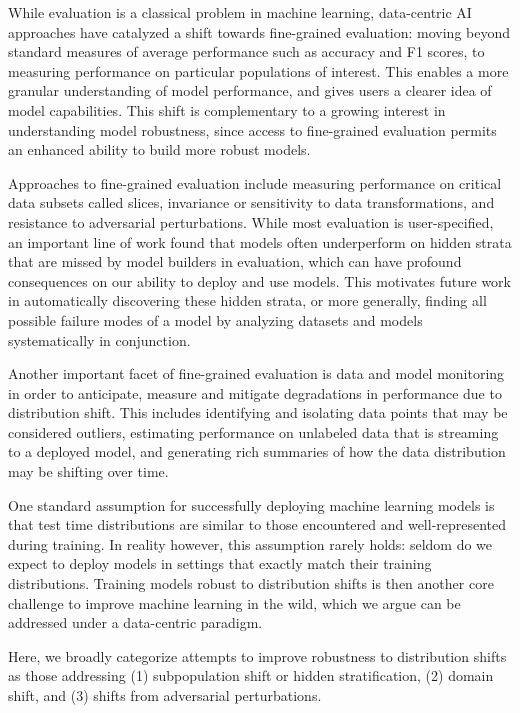 \documentclass[openany]{book}
\begin{document}
While evaluation is a classical problem in machine learning, data-centric AI approaches have catalyzed a shift towards fine-grained evaluation: moving beyond standard measures of average performance such as accuracy and F1 scores, to measuring performance on particular populations of interest. This enables a more granular understanding of model performance, and gives users a clearer idea of model capabilities. This shift is complementary to a growing interest in understanding model robustness, since access to fine-grained evaluation permits an enhanced ability to build more robust models.

Approaches to fine-grained evaluation include measuring performance on critical data subsets called slices, invariance or sensitivity to data transformations, and resistance to adversarial perturbations. While most evaluation is user-specified, an important line of work found that models often underperform on hidden strata that are missed by model builders in evaluation, which can have profound consequences on our ability to deploy and use models. This motivates future work in automatically discovering these hidden strata, or more generally, finding all possible failure modes of a model by analyzing datasets and models systematically in conjunction.

Another important facet of fine-grained evaluation is data and model monitoring in order to anticipate, measure and mitigate degradations in performance due to distribution shift. This includes identifying and isolating data points that may be considered outliers, estimating performance on unlabeled data that is streaming to a deployed model, and generating rich summaries of how the data distribution may be shifting over time.


One standard assumption for successfully deploying machine learning models is that test time distributions are similar to those encountered and well-represented during training. In reality however, this assumption rarely holds: seldom do we expect to deploy models in settings that exactly match their training distributions. Training models robust to distribution shifts is then another core challenge to improve machine learning in the wild, which we argue can be addressed under a data-centric paradigm.

Here, we broadly categorize attempts to improve robustness to distribution shifts as those addressing (1) subpopulation shift or hidden stratification, (2) domain shift, and (3) shifts from adversarial perturbations.
\end{document}
